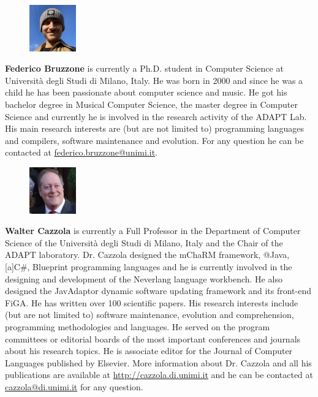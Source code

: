 \bigskip

\begin{figure}
    \includegraphics[width=2cm,keepaspectratio]{bios/federico}
\end{figure}\par
\noindent\textbf{Federico Bruzzone} is currently a Ph.D. student in Computer Science at Universit\`a degli Studi di Milano, Italy. He was born in 2000 and since he was a child he has been passionate about computer science and music. He got his bachelor degree in Musical Computer Science, the master degree in Computer Science and currently he is involved in the research activity of the ADAPT Lab. His main research interests are (but are not limited to) programming languages and compilers, software maintenance and evolution. For any question he can be contacted at \url{federico.bruzzone@unimi.it}.\smallskip

\begin{figure}
    \includegraphics[width=2cm,keepaspectratio]{bios/walter}
\end{figure}\par
\noindent\textbf{Walter Cazzola} is currently a Full Professor in the Department of Computer Science of the Università degli Studi di Milano, Italy and the Chair of the ADAPT laboratory. Dr\@. Cazzola designed the mChaRM framework, @Java, [a]C\#, Blueprint programming languages and he is currently involved in the designing and development of the Neverlang language workbench. He also designed the JavAdaptor dynamic software updating framework and its front-end FiGA\@. He has written over 100 scientific papers. His research interests include (but are not limited to) software maintenance, evolution and comprehension, programming methodologies and languages. He served on the program committees or editorial boards of the most important conferences and journals about his research topics. He is associate editor for the Journal of Computer Languages published by Elsevier. More information about Dr\@. Cazzola and all his publications are available at \url{http://cazzola.di.unimi.it} and he can be contacted at \url{cazzola@di.unimi.it} for any question.\smallskip

